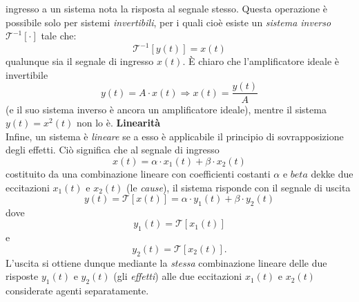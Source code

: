 \documentclass[12pt,oneside,openany]{memoir}
\numberwithin{equation}{subsection}
\begin{document}
ingresso a un sistema nota la risposta al segnale stesso. Questa operazione \`e
possibile solo per sistemi \textit{invertibili}, per i quali cio\`e esiste un
\textit{sistema inverso} $\mathcal{T}^{-1}[\cdot]$ tale  che:
\[
    \mathcal{T}^{-1}[y(t)] = x(t)
\]
qualunque sia il segnale di ingresso $x(t)$. \`E chiaro che l'amplificatore
ideale \`e invertibile
\[
    y(t) = A \cdot x(t) \Rightarrow x(t) = \frac{y(t)}{A}
\]
(e il suo sistema inverso \`e ancora un amplificatore ideale), mentre il sistema
$y(t) = x^2(t)$ non lo \`e.
\bigbreak
\noindent
\textbf{Linearit\`a}\\
Infine, un sistema \`e \textit{lineare} se a esso \`e applicabile il principio
di sovrapposizione degli effetti. Ci\`o significa che al segnale di ingresso
\[
    x(t) = \alpha \cdot x_1(t) + \beta \cdot x_2(t)
\]
costituito da una combinazione lineare con coefficienti costanti $\alpha$ e
$beta$ dekke due eccitazioni $x_1(t)$ e $x_2(t)$ (le \textit{cause}), il sistema
risponde con il segnale di uscita
\[
    y(t) = \mathcal{T}[x(t)] = \alpha \cdot y_1(t) + \beta \cdot y_2(t)
\]
dove
\[
    y_1(t) = \mathcal{T}[x_1(t)]
\]
e
\[
    y_2(t) = \mathcal{T}[x_2(t)].
\]
L'uscita si ottiene dunque mediante la \textit{stessa} combinazione lineare
delle due risposte $y_1(t)$ e $y_2(t)$ (gli \textit{effetti}) alle due
eccitazioni $x_1(t)$ e $x_2(t)$ considerate agenti separatamente.


\newpage
\end{document}

